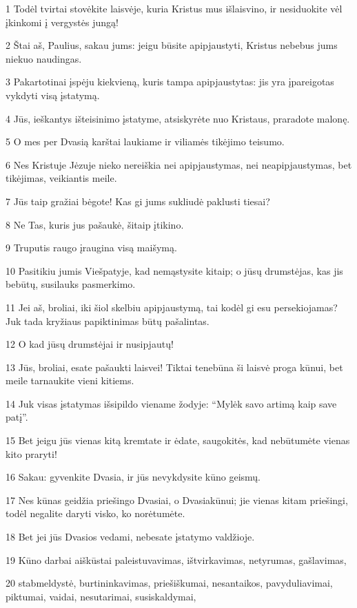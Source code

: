 \par 1 Todėl tvirtai stovėkite laisvėje, kuria Kristus mus išlaisvino, ir nesiduokite vėl įkinkomi į vergystės jungą! 
\par 2 Štai aš, Paulius, sakau jums: jeigu būsite apipjaustyti, Kristus nebebus jums niekuo naudingas. 
\par 3 Pakartotinai įspėju kiekvieną, kuris tampa apipjaustytas: jis yra įpareigotas vykdyti visą įstatymą. 
\par 4 Jūs, ieškantys išteisinimo įstatyme, atsiskyrėte nuo Kristaus, praradote malonę. 
\par 5 O mes per Dvasią karštai laukiame ir viliamės tikėjimo teisumo. 
\par 6 Nes Kristuje Jėzuje nieko nereiškia nei apipjaustymas, nei neapipjaustymas, bet tikėjimas, veikiantis meile. 
\par 7 Jūs taip gražiai bėgote! Kas gi jums sukliudė paklusti tiesai? 
\par 8 Ne Tas, kuris jus pašaukė, šitaip įtikino. 
\par 9 Truputis raugo įraugina visą maišymą. 
\par 10 Pasitikiu jumis Viešpatyje, kad nemąstysite kitaip; o jūsų drumstėjas, kas jis bebūtų, susilauks pasmerkimo. 
\par 11 Jei aš, broliai, iki šiol skelbiu apipjaustymą, tai kodėl gi esu persekiojamas? Juk tada kryžiaus papiktinimas būtų pašalintas. 
\par 12 O kad jūsų drumstėjai ir nusipjautų! 
\par 13 Jūs, broliai, esate pašaukti laisvei! Tiktai tenebūna ši laisvė proga kūnui, bet meile tarnaukite vieni kitiems. 
\par 14 Juk visas įstatymas išsipildo viename žodyje: “Mylėk savo artimą kaip save patį”. 
\par 15 Bet jeigu jūs vienas kitą kremtate ir ėdate, saugokitės, kad nebūtumėte vienas kito praryti! 
\par 16 Sakau: gyvenkite Dvasia, ir jūs nevykdysite kūno geismų. 
\par 17 Nes kūnas geidžia priešingo Dvasiai, o Dvasia­kūnui; jie vienas kitam priešingi, todėl negalite daryti visko, ko norėtumėte. 
\par 18 Bet jei jūs Dvasios vedami, nebesate įstatymo valdžioje. 
\par 19 Kūno darbai aiškūs­tai paleistuvavimas, ištvirkavimas, netyrumas, gašlavimas, 
\par 20 stabmeldystė, burtininkavimas, priešiškumai, nesantaikos, pavyduliavimai, piktumai, vaidai, nesutarimai, susiskaldymai, 
